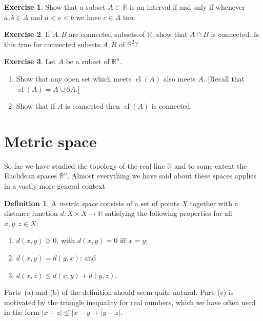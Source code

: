 \documentclass[11pt,oneside]{amsbook}
\newcommand{\RR}{\mathbb R}
\DeclareMathOperator{\cl}{cl}
\theoremstyle{definition}
\newtheorem{exerc}{Exercise}[section]
\theoremstyle{plain}
\theoremstyle{definition}
\newtheorem{defn}[thm]{Definition}
\theoremstyle{remark}
\numberwithin{equation}{section}
\numberwithin{figure}{section}
\begin{document}
\begin{exerc}
  Show that a subset $A\subset\RR$ is an interval if and only if whenever $a,b\in A$ and $a<c<b$ we have $c\in A$ too.
\end{exerc}


\begin{exerc}
  If $A,B$ are connected subsets of $\RR$, show that $A\cap B$ is connected. Is this true for connected subsets $A,B$ of $\RR^2$?
\end{exerc}

\begin{exerc}
  Let $A$ be a subset of $\RR^n$.
  \begin{enumerate}
    \item Show that any open set which meets $\cl(A)$ also meets $A$. [Recall that $\cl(A)=A\cup\partial A$.]
    \item Show that if $A$ is connected then $\cl(A)$ is connected.
  \end{enumerate}
\end{exerc}

\newpage
\section{Metric space}

So far we have studied the topology of the real line $\RR$ and to some extent the Euclidean spaces $\RR^n$. Almost everything we have said about these spaces applies in a vastly more general context

\begin{defn}
  A \emph{metric space} consists of a set of points $X$ together with a distance function $d\colon X\times X\to\RR$ satisfying the following properties for all $x,y,z\in X$:
  \begin{enumerate}
  \item $d(x,y)\geq0$, with $d(x,y)=0$ iff $x=y$;
  \item $d(x,y)=d(y,x)$; and
  \item $d(x,z)\leq d(x,y)+d(y,z)$.
  \end{enumerate}
\end{defn}

Parts~(a) and (b) of the definition should seem quite natural. Part~(c) is motivated by the triangle inequality for real numbers, which we have often used in the form $|x-z|\leq|x-y|+|y-z|$.
\end{document}
